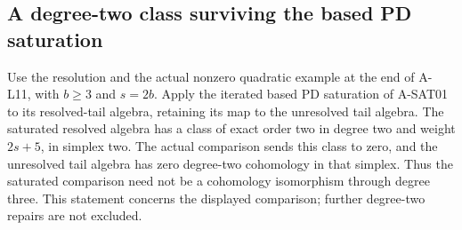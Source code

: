 \subsection{A degree-two class surviving the based PD saturation}

\begin{proposition}
\label{AL12}
Use the resolution and the actual nonzero quadratic
example at the end of A-L11, with $b\geq3$ and $s=2b$.
Apply the iterated based PD saturation of A-SAT01
to its resolved-tail algebra, retaining its map to
the unresolved tail algebra.
The saturated resolved algebra has a class of exact
order two in degree two and weight $2s+5$, in
simplex two.  The actual comparison sends this
class to zero, and the unresolved tail algebra
has zero degree-two cohomology in that simplex.
Thus the saturated comparison need not be a
cohomology isomorphism through degree three.
This statement concerns the displayed comparison;
further degree-two repairs are not excluded.
\end{proposition}

